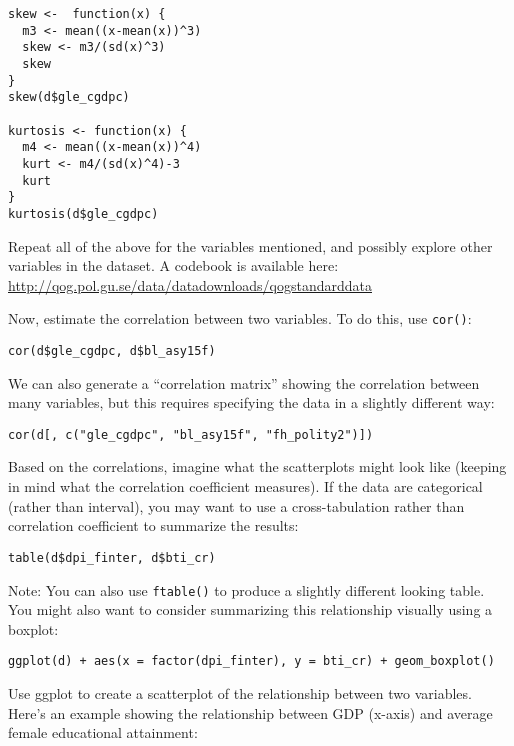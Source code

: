 \documentclass[a4paper,12pt]{article}
\begin{document}
\begin{enumerate*}
\begin{verbatim}
skew <-  function(x) {
  m3 <- mean((x-mean(x))^3)
  skew <- m3/(sd(x)^3)
  skew
}
skew(d$gle_cgdpc)

kurtosis <- function(x) {  
  m4 <- mean((x-mean(x))^4) 
  kurt <- m4/(sd(x)^4)-3  
  kurt
}
kurtosis(d$gle_cgdpc)
\end{verbatim}

\item Repeat all of the above for the variables mentioned, and possibly explore other variables in the dataset. A codebook is available here: \url{http://qog.pol.gu.se/data/datadownloads/qogstandarddata}

\item Now, estimate the correlation between two variables. To do this, use \texttt{cor()}:

\begin{verbatim}
cor(d$gle_cgdpc, d$bl_asy15f)
\end{verbatim}

\noindent We can also generate a ``correlation matrix'' showing the correlation between many variables, but this requires specifying the data in a slightly different way:

\begin{verbatim}
cor(d[, c("gle_cgdpc", "bl_asy15f", "fh_polity2")])
\end{verbatim}

\item Based on the correlations, imagine what the scatterplots might look like (keeping in mind what the correlation coefficient measures). If the data are categorical (rather than interval), you may want to use a cross-tabulation rather than correlation coefficient to summarize the results:

\begin{verbatim}
table(d$dpi_finter, d$bti_cr)
\end{verbatim}

\noindent Note: You can also use \texttt{ftable()} to produce a slightly different looking table. You might also want to consider summarizing this relationship visually using a boxplot:

\begin{verbatim}
ggplot(d) + aes(x = factor(dpi_finter), y = bti_cr) + geom_boxplot()
\end{verbatim}

\item Use ggplot to create a scatterplot of the relationship between two variables. Here's an example showing the relationship between GDP (x-axis) and average female educational attainment:


\end{enumerate*}
\end{document}
